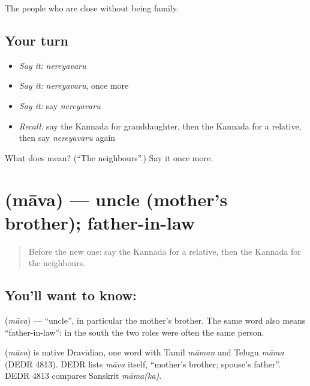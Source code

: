 \begin{grammarlens}[title={What you've built}]
The people who are close without being family.
\end{grammarlens}

\subsection*{Your turn}
\begin{itemize}
\raggedright
  \item \emph{Say it:} \emph{nereyavaru}
  \item \emph{Say it:} \emph{nereyavaru}, once more
  \item \emph{Say it:} say \emph{nereyavaru}
  \item \emph{Recall:} say the Kannada for granddaughter, then the Kannada for a relative, then say \emph{nereyavaru} again
\end{itemize}

\begin{tcolorbox}[breakable,colback=teal!4,colframe=teal!35!black,title={Before you move on}]
What does  mean? (\textquotedblleft{}The neighbours\textquotedblright{}.) Say it once more.
\end{tcolorbox}
\section[\texorpdfstring{\kn{ಮಾವ} (māva)}{ಮಾವ (māva)}]{ (māva) — uncle (mother's brother); father-in-law}

\label{lesson:KA-C90-uncle}



\begin{quote}
Before the new one: say the Kannada for a relative, then the Kannada for the neighbours.
\end{quote}

\subsection*{You'll want to know: }
\textbf{} (\emph{māva}) — \textquotedblleft{}uncle\textquotedblright{}, in particular the mother's brother. The same word also means \textquotedblleft{}father-in-law\textquotedblright{}: in the south the two roles were often the same person.

\begin{cousinweb}
\textbf{} (\emph{māva}) is native Dravidian, one word with Tamil \emph{māmaṉ} and Telugu \emph{māma} (DEDR 4813). DEDR lists \emph{māva} itself, \textquotedblleft{}mother's brother; spouse's father\textquotedblright{}. DEDR 4813 compares Sanskrit \emph{māma(ka)}.
\end{cousinweb}

